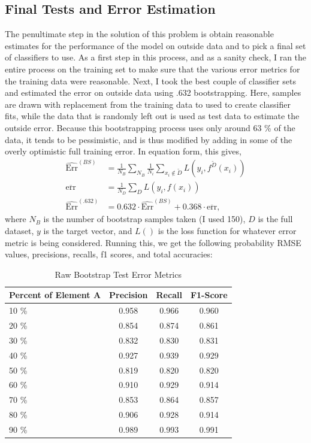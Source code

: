 \documentclass[11pt]{article}
\begin{document}
\subsection{Final Tests and Error Estimation}
\noindent The penultimate step in the solution of this problem is obtain reasonable estimates for the performance of the model on outside data and to pick a final set of classifiers to use. As a first step in this process, and as a sanity check, I ran the entire process on the training set to make sure that the various error metrics for the training data were reasonable. Next, I took the best couple of classifier sets and estimated the error on outside data using .632 bootstrapping. Here, samples are drawn with replacement from the training data to used to create classifier fits, while the data that is randomly left out is used as test data to estimate the outside error. Because this bootstrapping process uses only around 63 \% of the data, it tends to be pessimistic, and is thus modified by adding in some of the overly optimistic full training error. In equation form, this gives,
\begin{align}
\label{BS}
\widehat{\textrm{Err}}^{(BS)} &= \frac{1}{N_B}\sum_{N_B}\frac{1}{N_i}\sum_{x_i \notin \tilde{D}}L(y_i, f^{\tilde{D}}(x_i))\\
\overline{\textrm{err}}& =\frac{1}{N_D} \sum_{D} L(y_i, f(x_i))\\
\widehat{\textrm{Err}}^{(.632)} &= 0.632 \cdot \widehat{\textrm{Err}}^{(BS)} + 0.368 \cdot \overline{\textrm{err}},
\end{align}
where $N_B$ is the number of bootstrap samples taken (I used 150), $D$ is the full dataset, $y$ is the target vector, and $L()$ is the loss function for whatever error metric is being considered. Running this, we get the following probability RMSE values, precisions, recalls, f1 scores, and total accuracies:

\begin{table}[h!]
\caption{Raw Bootstrap Test Error Metrics}
\label{bs_res}
\vspace{3mm}
\centering
\begin{tabular}{lccc}
\toprule
\multicolumn{1}{l}{Percent of Element A}  & \multicolumn{1}{c}{Precision} & \multicolumn{1}{c}{Recall} & \multicolumn{1}{c}{F1-Score} \\
\midrule
10 \% & 0.958 & 0.966 & 0.960 \\
20 \% & 0.854 & 0.874 & 0.861 \\
30 \% & 0.832 & 0.830 & 0.831 \\
40 \% & 0.927 & 0.939 & 0.929 \\
50 \% & 0.819 & 0.820 & 0.820 \\
60 \% & 0.910 & 0.929 & 0.914 \\
70 \% & 0.853 & 0.864 & 0.857 \\
80 \% & 0.906 & 0.928 & 0.914 \\
90 \% & 0.989 & 0.993 & 0.991 \\
\bottomrule
\end{tabular}
\end{table}
\end{document}
